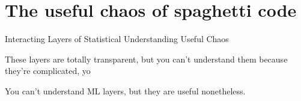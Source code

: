 \setchapterpreamble[u]{\margintoc}
\chapter{The useful chaos of spaghetti code}

Interacting Layers of Statistical Understanding
Useful Chaos

These layers are totally transparent, but you can't understand them because they're complicated, yo

You can't understand ML layers, but they are useful nonetheless.

